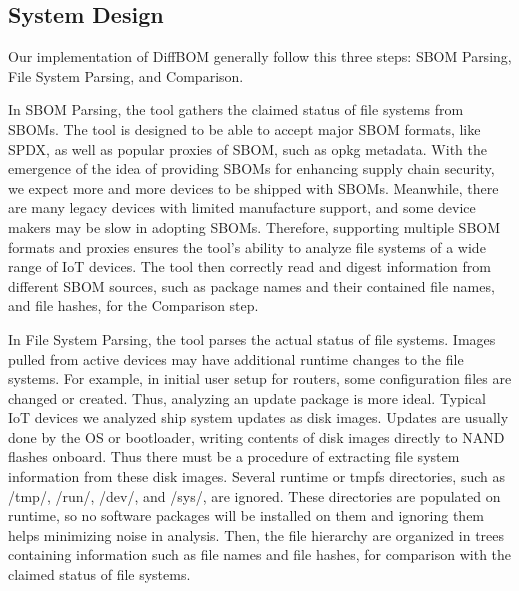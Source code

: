 \subsection{System Design}
Our implementation of DiffBOM generally follow this three steps: SBOM Parsing, File System Parsing, and Comparison.\par %
In SBOM Parsing, the tool gathers the claimed status of file systems from SBOMs. The tool is designed to be able to accept major SBOM formats, like SPDX, as well as popular proxies of SBOM, such as opkg metadata. With the emergence of the idea of providing SBOMs for enhancing supply chain security, we expect more and more devices to be shipped with SBOMs. Meanwhile, there are many legacy devices with limited manufacture support, and some device makers may be slow in adopting SBOMs. Therefore, supporting multiple SBOM formats and proxies ensures the tool's ability to analyze file systems of a wide range of IoT devices. The tool then correctly read and digest information from different SBOM sources, such as package names and their contained file names, and file hashes, for the Comparison step.\par
In File System Parsing, the tool parses the actual status of file systems. Images pulled from active devices may have additional runtime changes to the file systems. For example, in initial user setup for routers, some configuration files are changed or created. Thus, analyzing an update package is more ideal. Typical IoT devices we analyzed ship system updates as disk images. Updates are usually done by the OS or bootloader, writing contents of disk images directly to NAND flashes onboard. Thus there must be a procedure of extracting file system information from these disk images. Several runtime or tmpfs directories, such as /tmp/, /run/, /dev/, and /sys/, are ignored. These directories are populated on runtime, so no software packages will be installed on them and ignoring them helps minimizing noise in analysis. Then, the file hierarchy are organized in trees containing information such as file names and file hashes, for comparison with the claimed status of file systems.\par
